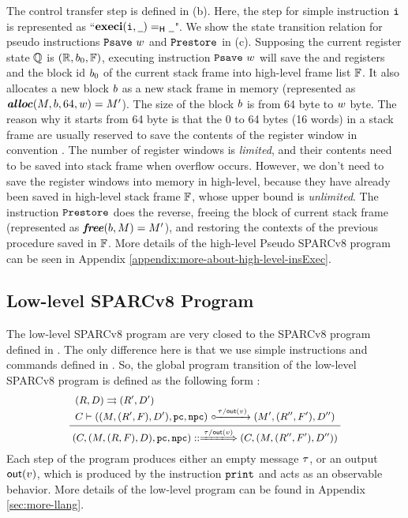 The control transfer step is defined in  
\Fig{\ref{fig:selected-opsem-high-level-prog}} (b). 
Here, the step for simple instruction $\texttt{i}{}$ is 
represented as ``$\textbf{execi}{{(\texttt{i}{}, \underline{\ \,})}} =_{\textsf{H}} {\underline{\ \,}}$". 
We show the state transition relation for pseudo instructions 
$\texttt{Psave} \ w$ and $\texttt{Prestore}$ in 
\Fig{\ref{fig:selected-opsem-high-level-prog}} (c). 
Supposing the current register state $\mathbb{Q}$ is 
$(\mathbb{R}, b_0, \mathbb{F})$, executing instruction
$\texttt{Psave} \ w$ will save the \localRN{} and \inRN{} registers 
and the block id  $b_0$ of the current stack frame 
into high-level frame list $\mathbb{F}$. It also allocates 
a new block $b$ as a new stack frame in memory 
(represented as $\textbf{\textit{alloc}}(M, b, 64, w) = M'$). 
The size of the block $b$ is from 64 byte to $w$ byte. 
The reason why it starts from 64 byte is that the 0 to 64 bytes 
(16 words) in a stack frame are usually reserved to save 
the contents of the register window in convention \cite{sparc}.  
The number of register windows is {\it limited}, and their contents  
need to be saved into stack frame when overflow occurs. 
However, we don't need to save the register windows 
into memory in high-level, because they have already been 
saved in high-level stack frame $\mathbb{F}$, 
whose upper bound is {\it unlimited}. 
The instruction $\texttt{Prestore}$ does the reverse, 
freeing the block of current stack frame
(represented as $\textbf{\textit{free}}(b, M) = M'$), and 
restoring the contexts of the previous procedure saved in $\mathbb{F}$. 
More details of the high-level Pseudo 
SPARCv8 program can be seen in Appendix \ref{appendix:more-about-high-level-insExec}.

\subsection{Low-level SPARCv8 Program}
\label{subsec:low-level SPARCv8 Program}

The low-level SPARCv8 program are very closed to the SPARCv8 program 
defined in \Fig{\ref{fig:Machine States and Language for SPARC Code}}. 
The only difference here is that we use simple instructions and commands 
defined in \Fig{\ref{fig:syntax-of-concur-pseudo-sparc}}. So, the global 
program transition of the low-level SPARCv8 program is defined as 
the following form : 
\[
    \small
    \infer
    {
        \LGlobTrans{(\code, (\Mem, (\RFile, \Wstack), \DBuf), \pc, \npc)}
            { \empmsg / \outEvt{\val} }
            {(\code, (\Mem, (\RFile'', \Wstack'), \DBuf''))}
    }
    {
        \begin{array}{l}
            \Dstep{(\RFile, \DBuf)}{(\RFile', \DBuf')} \\
            \llocalstep{\code}
                {((\Mem, (\RFile', \Wstack), \DBuf'), \pc, \npc)}
                { \empmsg / \outEvt{\val} }
                {(\Mem', (\RFile'', \Wstack'), \DBuf'')}
        \end{array}
    }
\]
Each step of the program produces either an empty message $\tau$, or  
an output $\textsf{out}({v})$, which is produced by the instruction 
$\texttt{print}$ and acts as an observable behavior. 
More details of the low-level program can be found in Appendix 
\ref{sec:more-llang}. 


